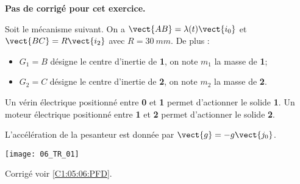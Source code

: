 \normaltrue
\correctionfalse


\setcounter{numques}{0}
\ifcorrection
\else
\textbf{Pas de corrigé pour cet exercice.}
\fi

\ifprof
\else
Soit le mécanisme suivant. On a $\vect{AB}=\lambda(t)\vect{i_0}$ et $\vect{BC}=R\vect{i_2}$ avec $R=\SI{30}{mm}$.
De plus :
\begin{itemize}
\item $G_1=B$ désigne le centre d'inertie de \textbf{1}, on note $m_1$ la masse de \textbf{1};%
\item $G_2=C$ désigne le centre d'inertie de \textbf{2}, on note $m_2$ la masse de \textbf{2}.%
\end{itemize}

Un vérin électrique positionné entre \textbf{0} et \textbf{1}  permet d'actionner le solide \textbf{1}.
Un moteur électrique positionné entre \textbf{1} et \textbf{2}  permet d'actionner le solide \textbf{2}.

L'accélération de la pesanteur est donnée par $\vect{g}=-g\vect{j_0}$.

\begin{center}
\texttt{[image: 06\_TR\_01]}
\end{center}
\fi

\ifprof
\else
\fi

\ifprof
\else
\fi

\ifprof
\else
\begin{flushright}
\footnotesize{Corrigé  voir \ref{C1:05:06:PFD}.}
\end{flushright}%
\fi